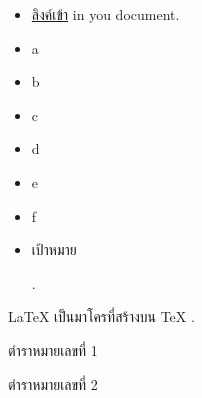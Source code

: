 \documentclass{article}
\begin{document}
\begin{itemize}
    \item \hyperlink{link1}{ลิงค์เข้า} in you document.
    \item a
    \item b
    \item c
    \item d
    \item e
    \item f
    \item \hypertarget{link1}{เป้าหมาย}.
\end{itemize}


\LaTeX{} \cite{book1} เป็นมาโครที่สร้างบน \TeX{} \cite{book2}.


\begin{thebibliography}{9}
    ตำราหมายเลขที่ 1
    
    ตำราหมายเลขที่ 2

\end{thebibliography}
\end{document}
